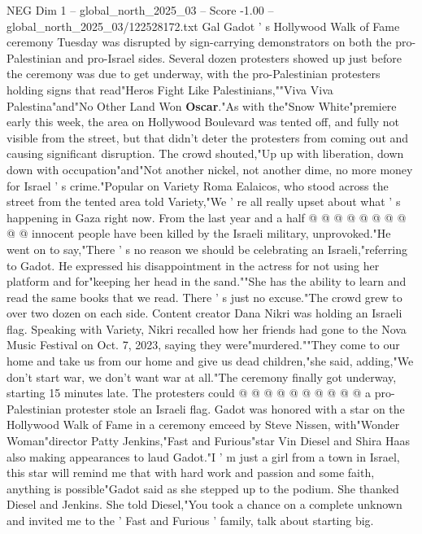 \begin{textsample}{NEG Dim 1 – global\_north\_2025\_03 – Score -1.00 – global\_north\_2025\_03/122528172.txt}  \label{ex:f1_neg_030}
Gal Gadot ' s Hollywood Walk of Fame ceremony Tuesday was disrupted by sign-carrying demonstrators on both the pro-Palestinian and pro-Israel sides.
Several dozen protesters showed up just before the ceremony was due to get underway, with the pro-Palestinian protesters holding signs that read"Heros Fight Like Palestinians,""Viva Viva Palestina"and"No Other Land Won \textbf{Oscar}."As with the"Snow White"premiere early this week, the area on Hollywood Boulevard was tented off, and fully not visible from the street, but that didn't deter the protesters from coming out and causing significant disruption.
The crowd shouted,"Up up with liberation, down down with occupation"and"Not another nickel, not another dime, no more money for Israel ' s crime."Popular on Variety Roma Ealaicos, who stood across the street from the tented area told Variety,"We ' re all really upset about what ' s happening in Gaza right now.
From the last year and a half @ @ @ @ @ @ @ @ @ @ innocent people have been killed by the Israeli military, unprovoked."He went on to say,"There ' s no reason we should be celebrating an Israeli,"referring to Gadot.
He expressed his disappointment in the actress for not using her platform and for"keeping her head in the sand.""She has the ability to learn and read the same books that we read.
There ' s just no excuse."The crowd grew to over two dozen on each side.
Content creator Dana Nikri was holding an Israeli flag.
Speaking with Variety, Nikri recalled how her friends had gone to the Nova Music Festival on Oct. 7, 2023, saying they were"murdered.""They come to our home and take us from our home and give us dead children,"she said, adding,"We don't start war, we don't want war at all."The ceremony finally got underway, starting 15 minutes late.
The protesters could @ @ @ @ @ @ @ @ @ @ a pro-Palestinian protester stole an Israeli flag.
Gadot was honored with a star on the Hollywood Walk of Fame in a ceremony emceed by Steve Nissen, with"Wonder Woman"director Patty Jenkins,"Fast and Furious"star Vin Diesel and Shira Haas also making appearances to laud Gadot."I ' m just a girl from a town in Israel, this star will remind me that with hard work and passion and some faith, anything is possible"Gadot said as she stepped up to the podium.
She thanked Diesel and Jenkins.
She told Diesel,"You took a chance on a complete unknown and invited me to the ' Fast and Furious ' family, talk about starting big.

\end{textsample}
